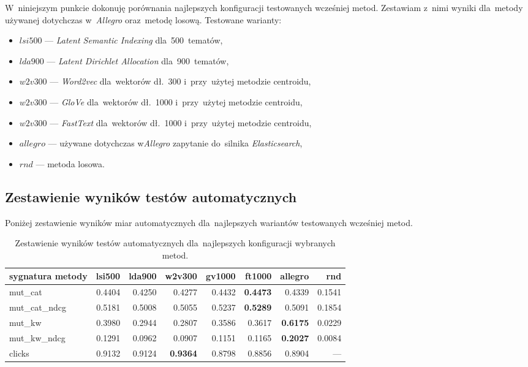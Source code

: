 \documentclass[pl]{minipw} %
\begin{document}
W~niniejszym punkcie dokonuję porównania najlepszych konfiguracji testowanych wcześniej metod. Zestawiam z~nimi wyniki dla~metody używanej dotychczas w~\textit{Allegro} oraz~metodę losową.
Testowane warianty:
\begin{itemize}
	\item $lsi500$ --- \textit{Latent Semantic Indexing} dla~500~tematów,
	\item $lda900$ --- \textit{Latent Dirichlet Allocation} dla~900~tematów,
	\item $w2v300$ --- \textit{Word2vec} dla~wektorów dł.~300 i~przy~użytej metodzie centroidu,
	\item $w2v300$ --- \textit{GloVe} dla~wektorów dł.~1000 i~przy~użytej metodzie centroidu,
	\item $w2v300$ --- \textit{FastText} dla~wektorów dł.~1000 i~przy~użytej metodzie centroidu,
	\item $allegro$ --- używane dotychczas w\textit{Allegro} zapytanie do~silnika \textit{Elasticsearch},
	\item $rnd$ --- metoda losowa.
\end{itemize}
\subsection{Zestawienie wyników testów automatycznych}
Poniżej zestawienie wyników miar automatycznych dla~najlepszych wariantów testowanych wcześniej metod.
\begin{table}[H]
	\centering
	\begin{tabular}{lrrrrrrr}
		\hline
		sygnatura metody &   lsi500 &    lda900 &    w2v300 &   gv1000 &   ft1000 &   allegro &          rnd \\
		\hline
		mut\_cat      &   0.4404 &   0.4250  &   0.4277 &   0.4432 &   \textbf{0.4473} &    0.4339 &   0.1541 \\
		mut\_cat\_ndcg &   0.5181 &   0.5008 &   0.5055 &   0.5237 &   \textbf{0.5289} &    0.5091 &   0.1854 \\
		mut\_kw       &   0.3980  &   0.2944 &   0.2807 &   0.3586 &   0.3617 &    \textbf{0.6175} &   0.0229 \\
		mut\_kw\_ndcg  &   0.1291 &   0.0962 &   0.0907 &   0.1151 &   0.1165 &    \textbf{0.2027} &   0.0084 \\
		clicks       &   0.9132 &   0.9124 &   \textbf{0.9364} &   0.8798 &   0.8856 &    0.8904 & ---      \\
		\hline
	\end{tabular}
	\caption{Zestawienie wyników testów automatycznych dla~najlepszych konfiguracji wybranych metod.}
\end{table}
\end{document}
